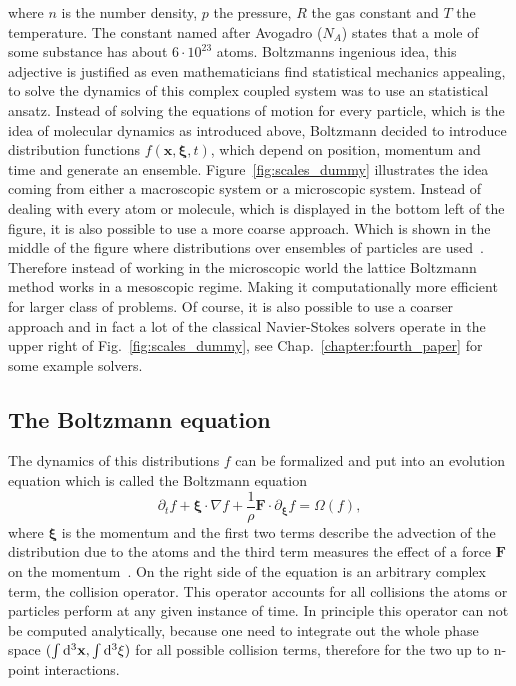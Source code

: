 where $n$ is the number density, $p$ the pressure, $R$ the gas constant and $T$ the temperature.
The constant named after Avogadro ($N_A$) states that a mole of some substance has about $6 \cdot 10^{23}$ atoms.
Boltzmanns ingenious idea, this adjective is justified as even mathematicians find statistical mechanics appealing, to solve the dynamics of this complex coupled system was to use an statistical ansatz.
Instead of solving the equations of motion for every particle, which is the idea of molecular dynamics as introduced above, Boltzmann decided to introduce distribution functions $f(\mathbf{x},{\boldsymbol\xi},t)$, which depend on position, momentum and time and generate an ensemble.
Figure~\ref{fig:scales_dummy} illustrates the idea coming from either a macroscopic system or a microscopic system.
Instead of dealing with every atom or molecule, which is displayed in the bottom left of the figure, it is also possible to use a more coarse approach. 
Which is shown in the middle of the figure where distributions over ensembles of particles are used~\cite{raabe2004overview}.
Therefore instead of working in the microscopic world the lattice Boltzmann method works in a mesoscopic regime.
Making it computationally more efficient for larger class of problems.
Of course, it is also possible to use a coarser approach and in fact a lot of the classical Navier-Stokes solvers operate in the upper right of Fig.~\ref{fig:scales_dummy}, see Chap.~\ref{chapter:fourth_paper} for some example solvers.

\subsection{The Boltzmann equation}
The dynamics of this distributions $f$ can be formalized and put into an evolution equation which is called the Boltzmann equation
\begin{equation}\label{eq:boltzmann_eq}
    \partial_t f + {\boldsymbol\xi}\cdot\nabla f + \frac{1}{\rho}\mathbf{F}\cdot\partial_{{\boldsymbol\xi}}f = \Omega(f), 
\end{equation}
where ${\boldsymbol\xi}$ is the momentum and the first two terms describe the advection of the distribution due to the atoms and the third term measures the effect of a force $\mathbf{F}$ on the momentum~\cite{krueger2017}.
On the right side of the equation is an arbitrary complex term, the collision operator.
This operator accounts for all collisions the atoms or particles perform at any given instance of time.
In principle this operator can not be computed analytically, because one need to integrate out the whole phase space $(\int \mathop{}\!\mathrm{d}^3\mathbf{x}, \int \mathop{}\!\mathrm{d}^3\xi)$ for all possible collision terms, therefore for the two up to n-point interactions. 

